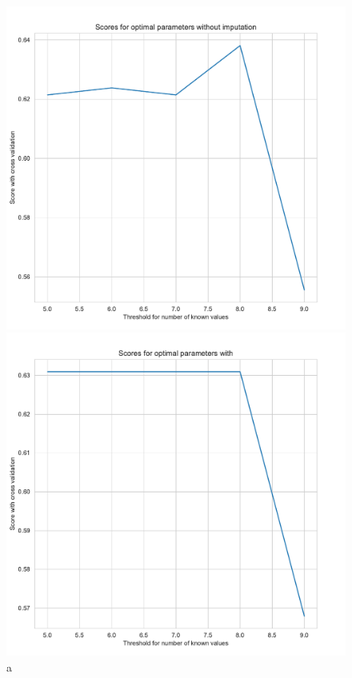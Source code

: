 \documentclass[11pt]{article}
\begin{document}
\begin{figure}[h]
\begin{minipage}[l]{0.5\textwidth}
\includegraphics[width=1\linewidth]{bridges/threshold_grid_nb0.pdf}
\end{minipage}
\begin{minipage}[l]{0.5\textwidth}
\includegraphics[width=1\linewidth]{bridges/threshold_grid_nb1.pdf}
\end{minipage}
\caption{a}
\label{Fig:: NB_treshhold_grid}
\end{figure}
\end{document}
